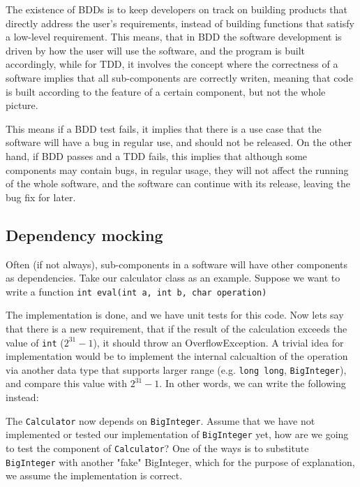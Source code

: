 The existence of BDDs is to keep developers on track on building products that directly address the user's requirements, instead of building functions that satisfy a low-level requirement. This means, that in BDD the software development is driven by how the user will use the software, and the program is built accordingly, while for TDD, it involves the concept where the correctness of a software implies that all sub-components are correctly writen, meaning that code is built according to the feature of a certain component, but not the whole picture. 

This means if a BDD test fails, it implies that there is a use case that the software will have a bug in regular use, and should not be released. On the other hand, if BDD passes and a TDD fails, this implies that although some components may contain bugs, in regular usage, they will not affect the running of the whole software, and the software can continue with its release, leaving the bug fix for later. 

\subsection{Dependency mocking}

Often (if not always), sub-components in a software will have other components as dependencies. Take our calculator class as an example. Suppose we want to write a function \texttt{int eval(int a, int b, char operation)}


The implementation is done, and we have unit tests for this code. Now lets say that there is a new requirement, that if the result of the calculation exceeds the value of \texttt{int} ($2^{31}-1$), it should throw an OverflowException. A trivial idea for implementation would be to implement the internal calcualtion of the operation via another data type that supports larger range (e.g. \texttt{long long}, \texttt{BigInteger}), and compare this value with $2^{31}-1$. In other words, we can write the following instead:


The \texttt{Calculator} now depends on \texttt{BigInteger}. Assume that we have not implemented or tested our implementation of \texttt{BigInteger} yet, how are we going to test the component of \texttt{Calculator}? One of the ways is to substitute \texttt{BigInteger} with another "fake" BigInteger, which for the purpose of explanation, we assume the implementation is correct.

